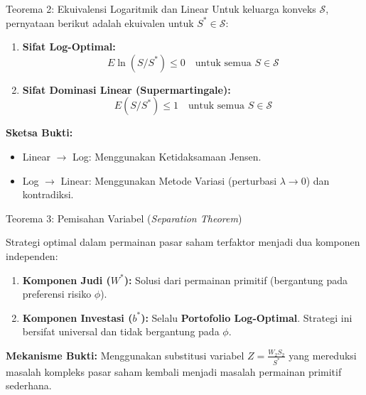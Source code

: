 \documentclass{beamer}
\begin{document}
\begin{frame}{Teorema 2: Ekuivalensi Logaritmik dan Linear}
    Untuk keluarga konveks $\mathcal{S}$, pernyataan berikut adalah ekuivalen untuk $S^* \in \mathcal{S}$:
    
    \begin{enumerate}
        \item \textbf{Sifat Log-Optimal:}
        $$E \ln(S/S^*) \le 0 \quad \text{untuk semua } S \in \mathcal{S}$$
        \item \textbf{Sifat Dominasi Linear (Supermartingale):}
        $$E(S/S^*) \le 1 \quad \text{untuk semua } S \in \mathcal{S}$$
    \end{enumerate}
    
    \vspace{0.5cm}
    \textbf{Sketsa Bukti:}
    \begin{itemize}
        \item Linear $\to$ Log: Menggunakan Ketidaksamaan Jensen.
        \item Log $\to$ Linear: Menggunakan Metode Variasi (perturbasi $\lambda \to 0$) dan kontradiksi.
    \end{itemize}
\end{frame}

\begin{frame}{Teorema 3: Pemisahan Variabel (\textit{Separation Theorem})}
    \begin{theorem}
        Strategi optimal dalam permainan pasar saham terfaktor menjadi dua komponen independen:
    \end{theorem}
    
    \begin{enumerate}
        \item \textbf{Komponen Judi ($W^*$):} 
        Solusi dari permainan primitif (bergantung pada preferensi risiko $\phi$).
        \item \textbf{Komponen Investasi ($b^*$):} 
        Selalu \textbf{Portofolio Log-Optimal}. Strategi ini bersifat universal dan tidak bergantung pada $\phi$.
    \end{enumerate}
    
    \vspace{0.3cm}
    \textbf{Mekanisme Bukti:}
    Menggunakan substitusi variabel $Z = \frac{W_2 S_2}{S^*}$ yang mereduksi masalah kompleks pasar saham kembali menjadi masalah permainan primitif sederhana.
\end{frame}
\end{document}
